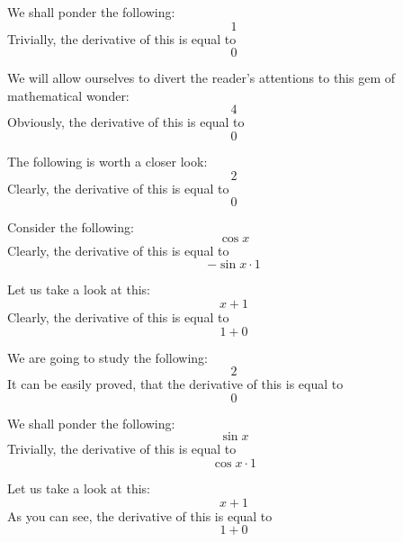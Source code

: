 \documentclass{article}
\begin{document}
We shall ponder the following:
\begin{equation}
1 
\end{equation}
Trivially, the derivative of this is equal to
\begin{equation}
0 
\end{equation}

We will allow ourselves to divert the reader's attentions to this gem of mathematical wonder:
\begin{equation}
4 
\end{equation}
Obviously, the derivative of this is equal to
\begin{equation}
0 
\end{equation}

The following is worth a closer look:
\begin{equation}
2 
\end{equation}
Clearly, the derivative of this is equal to
\begin{equation}
0 
\end{equation}

Consider the following:
\begin{equation}
\cos x 
\end{equation}
Clearly, the derivative of this is equal to
\begin{equation}
-\sin x \cdot 1 
\end{equation}

Let us take a look at this:
\begin{equation}
x + 1 
\end{equation}
Clearly, the derivative of this is equal to
\begin{equation}
1 + 0 
\end{equation}

We are going to study the following:
\begin{equation}
2 
\end{equation}
It can be easily proved, that the derivative of this is equal to
\begin{equation}
0 
\end{equation}

We shall ponder the following:
\begin{equation}
\sin x 
\end{equation}
Trivially, the derivative of this is equal to
\begin{equation}
\cos x \cdot 1 
\end{equation}

Let us take a look at this:
\begin{equation}
x + 1 
\end{equation}
As you can see, the derivative of this is equal to
\begin{equation}
1 + 0 
\end{equation}
\end{document}

